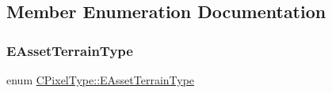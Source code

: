 \subsection{Member Enumeration Documentation}
\hypertarget{classCPixelType_af06457fd1c2ff34c67ce670e633a10b0}{}\label{classCPixelType_af06457fd1c2ff34c67ce670e633a10b0} 
\subsubsection{\texorpdfstring{E\+Asset\+Terrain\+Type}{EAssetTerrainType}}
{\footnotesize\ttfamily enum \hyperlink{classCPixelType_af06457fd1c2ff34c67ce670e633a10b0}{C\+Pixel\+Type\+::\+E\+Asset\+Terrain\+Type}}

